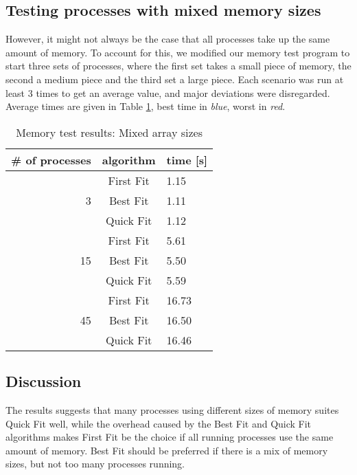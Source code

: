 \documentclass[11pt]{article}
\begin{document}
\subsection{Testing processes with mixed memory sizes}
However, it might not always be the case that all processes take up the same amount of memory. To account for this, we modified our memory test program to start three sets of processes, where the first set takes a small piece of memory, the second a medium piece and the third set a large piece. Each scenario was run at least 3 times to get an average value, and major deviations were disregarded. Average times are given in Table \ref{tab:memory_results_mix}, best time in \emph{\color{MidnightBlue}blue}, worst in \emph{\color{BrickRed}red}.

\begin{table}
	\begin{center}
		\begin{tabular}{ r | c | l }
		{ \bf \# of processes} & { \bf algorithm } & { \bf time [s] }\\
		\hline
		   & First Fit & {\color{BrickRed}1.15}\\
		3  & Best Fit	 & {\color{MidnightBlue}1.11}\\
		   & Quick Fit & 1.12\\
    \hline
		   & First Fit & {\color{BrickRed}5.61}\\
		15 & Best Fit  & {\color{MidnightBlue}5.50}\\
		   & Quick Fit & 5.59\\
		\hline
		   & First Fit & {\color{BrickRed}16.73}\\
		45 & Best Fit  & 16.50\\
		   & Quick Fit & {\color{MidnightBlue}16.46}\\
		\end{tabular}
	  
	  \caption{Memory test results: Mixed array sizes}
	  \label{tab:memory_results_mix}
	\end{center}
\end{table}

\subsection{Discussion}
The results suggests that many processes using different sizes of memory suites Quick Fit well, while the overhead caused by the Best Fit and Quick Fit algorithms makes First Fit be the choice if all running processes use the same amount of memory. Best Fit should be preferred if there is a mix of memory sizes, but not too many processes running.
\end{document}
